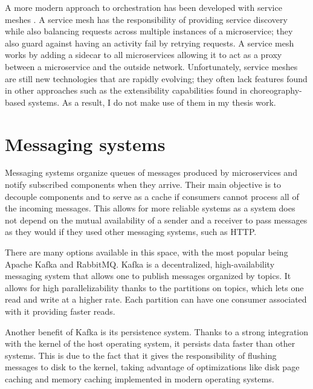 A more modern approach to orchestration has been developed with service meshes \parencite{servicemesh}. A service mesh has the responsibility of providing service discovery while also balancing requests across multiple instances of a microservice; they also guard against having an activity fail by retrying requests. A service mesh works by adding a sidecar to all microservices allowing it to act as a proxy between a microservice and the outside network. Unfortunately, service meshes are still new technologies that are rapidly evolving; they often lack features found in other approaches such as the extensibility capabilities found in choreography-based systems. As a result, I do not make use of them in my thesis work.


\section{Messaging systems}

Messaging systems organize queues of messages produced by microservices and notify subscribed components when they arrive. Their main objective is to decouple components and to serve as a cache if consumers cannot process all of the incoming messages. This allows for more reliable systems as a system does not depend on the mutual availability of a sender and a receiver to pass messages as they would if they used other messaging systems, such as HTTP.

There are many options available in this space, with the most popular being Apache Kafka and RabbitMQ. Kafka is a decentralized, high-availability messaging system that allows one to publish messages organized by topics. It allows for high parallelizability thanks to the partitions on topics, which lets one read and write at a higher rate. Each partition can have one consumer associated with it providing faster reads.

Another benefit of Kafka is its persistence system. Thanks to a strong integration with the kernel of the host operating system, it persists data faster than other systems. This is due to the fact that it gives the responsibility of flushing messages to disk to the kernel, taking advantage of optimizations like disk page caching and memory caching implemented in modern operating systems.


